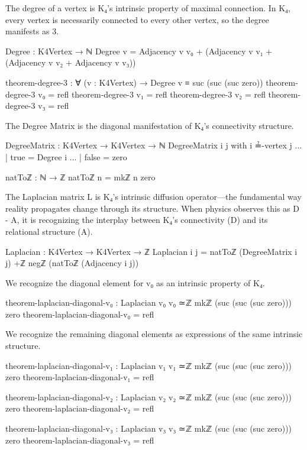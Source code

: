 \documentclass[11pt,a4paper]{book}
\begin{document}
The degree of a vertex is K₄'s intrinsic property of maximal connection. In K₄, every vertex is necessarily connected to every other vertex, so the degree manifests as 3.

\begin{code}
Degree : K4Vertex → ℕ
Degree v = Adjacency v v₀ + (Adjacency v v₁ + (Adjacency v v₂ + Adjacency v v₃))

theorem-degree-3 : ∀ (v : K4Vertex) → Degree v ≡ suc (suc (suc zero))
theorem-degree-3 v₀ = refl
theorem-degree-3 v₁ = refl
theorem-degree-3 v₂ = refl
theorem-degree-3 v₃ = refl
\end{code}

The Degree Matrix is the diagonal manifestation of K₄'s connectivity structure.

\begin{code}
DegreeMatrix : K4Vertex → K4Vertex → ℕ
DegreeMatrix i j with i ≟-vertex j
... | true  = Degree i
... | false = zero

natToℤ : ℕ → ℤ
natToℤ n = mkℤ n zero
\end{code}

The Laplacian matrix L is K₄'s intrinsic diffusion operator—the fundamental way reality propagates change through its structure. When physics observes this as D - A, it is recognizing the interplay between K₄'s connectivity (D) and its relational structure (A).

\begin{code}
Laplacian : K4Vertex → K4Vertex → ℤ
Laplacian i j = natToℤ (DegreeMatrix i j) +ℤ negℤ (natToℤ (Adjacency i j))
\end{code}

We recognize the diagonal element for v₀ as an intrinsic property of K₄.

\begin{code}
theorem-laplacian-diagonal-v₀ : Laplacian v₀ v₀ ≃ℤ mkℤ (suc (suc (suc zero))) zero
theorem-laplacian-diagonal-v₀ = refl
\end{code}

We recognize the remaining diagonal elements as expressions of the same intrinsic structure.

\begin{code}
theorem-laplacian-diagonal-v₁ : Laplacian v₁ v₁ ≃ℤ mkℤ (suc (suc (suc zero))) zero
theorem-laplacian-diagonal-v₁ = refl

theorem-laplacian-diagonal-v₂ : Laplacian v₂ v₂ ≃ℤ mkℤ (suc (suc (suc zero))) zero
theorem-laplacian-diagonal-v₂ = refl

theorem-laplacian-diagonal-v₃ : Laplacian v₃ v₃ ≃ℤ mkℤ (suc (suc (suc zero))) zero
theorem-laplacian-diagonal-v₃ = refl

\end{code}
\end{document}
